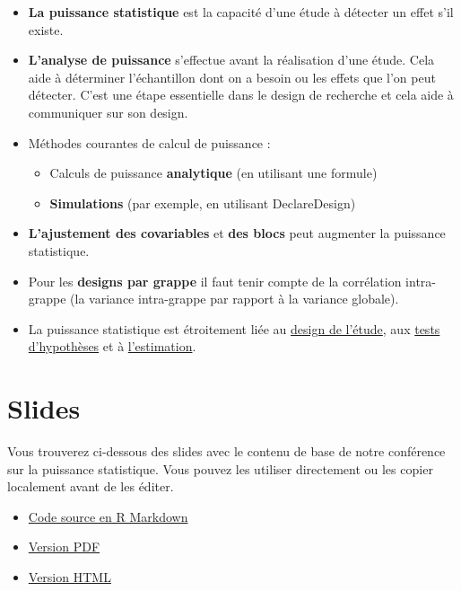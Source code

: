 \documentclass[
  12pt,
]{book}
\begin{document}
\begin{itemize}
\item
  \textbf{La puissance statistique} est la capacité d'une étude à détecter un effet s'il existe.
\item
  \textbf{L'analyse de puissance} s'effectue avant la réalisation d'une étude. Cela aide à déterminer l'échantillon dont on a besoin ou les effets que l'on peut détecter. C'est une étape essentielle dans le design de recherche et cela aide à communiquer sur son design.
\item
  Méthodes courantes de calcul de puissance :

  \begin{itemize}
  \item
    Calculs de puissance \textbf{analytique} (en utilisant une formule)
  \item
    \textbf{Simulations} (par exemple, en utilisant DeclareDesign)
  \end{itemize}
\item
  \textbf{L'ajustement des covariables} et \textbf{des blocs} peut augmenter la puissance statistique.
\item
  Pour les \textbf{designs par grappe} il faut tenir compte de la corrélation intra-grappe (la variance intra-grappe par rapport à la variance globale).
\item
  La puissance statistique est étroitement liée au \href{the-research-design-process.html}{design de l'étude}, aux \href{hypothesis-testing.html}{tests d'hypothèses} et à \href{estimands-and-estimators.html}{l'estimation}.
\end{itemize}

\hypertarget{slides-5}{%
\section{Slides}\label{slides-5}}

Vous trouverez ci-dessous des slides avec le contenu de base de notre conférence sur la puissance statistique. Vous pouvez les utiliser directement ou les copier localement avant de les éditer.

\begin{itemize}
\item
  \href{https://egap.github.io/learningdays-resources/Slides/power-slides.Rmd}{Code source en R Markdown}
\item
  \href{https://egap.github.io/learningdays-resources/Slides/power-slides.pdf}{Version PDF}
\item
  \href{https://egap.github.io/learningdays-resources/Slides/power-slides.html}{Version HTML}
\end{itemize}
\end{document}
